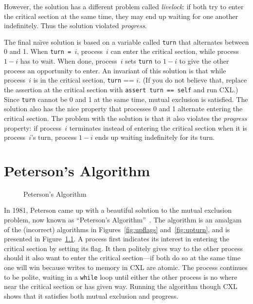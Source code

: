 \documentclass{report}
\newenvironment{code}{
\tcolorbox
}{
\endtcolorbox
}
\begin{document}
However, the solution has a different problem called \emph{livelock}:
if both try to enter the critical section at the same time, they may
end up waiting for one another indefinitely.  Thus the solution
violated \emph{progress}.

The final na\"{\i}ve solution is based on a variable called \texttt{turn}
that alternates between 0 and 1.  When \texttt{turn = $i$}, process~$i$ can
enter the critical section, while process $1-i$ has to wait.  When done,
process~$i$ sets \texttt{turn} to $1-i$ to give the other process an
opportunity to enter.
An invariant of this solution is that while process~$i$ is in the critical
section, \texttt{turn} == $i$.
(If you do not believe that, replace the assertion at the critical
section with \texttt{assert turn == self} and run CXL.)
Since \texttt{turn} cannot be 0 and 1 at
the same time, mutual exclusion is satisfied.
The solution also has the nice property that
processes 0 and 1 alternate entering the critical section.
The problem with the solution is
that it also violates the \emph{progress} property:
if process~$i$ terminates instead of entering the critical section when it
is process~$i$'s turn, process $1-i$ ends up waiting indefinitely for its
turn.

\chapter{Peterson's Algorithm}

\begin{figure}
\begin{code}

\end{code}
\caption{Peterson's Algorithm}
\label{fig:peterson}
\end{figure}

In 1981, Peterson came up with a beautiful solution to the mutual exclusion
problem, now known as ``Peterson's Algorithm''~\cite{Peterson81}.
The algorithm is an amalgam of the (incorrect) algorithms in
Figures~\ref{fig:upflags} and~\ref{fig:upturn}, and is presented
in Figure~\ref{fig:peterson}.
A process first indicates its interest in entering the critical section
by setting its flag.
It then politely gives way to the other process should it also want to
enter the critical section---if both do so at the same time one will
win because writes to memory in CXL are atomic.
The process continues to be polite, waiting in a \texttt{while} loop
until either the other process is no where near the critical section
or has given way.
Running the algorithm though CXL shows that it satisfies both mutual
exclusion and progress.
\end{document}
